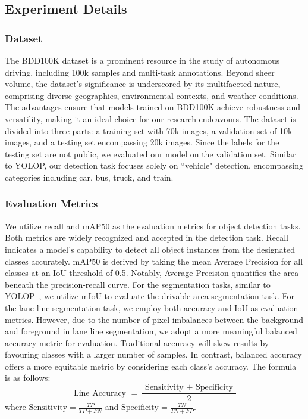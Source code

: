 \documentclass[lettersize,journal]{IEEEtran}
\begin{document}
\subsection{Experiment Details}
\label{subsec: Experiment Details}

\subsubsection{Dataset}
\label{subsubsec: Dataset}
The BDD100K dataset is a prominent resource in the study of autonomous driving, including 100k samples and multi-task annotations. Beyond sheer volume, the dataset's significance is underscored by its multifaceted nature, comprising diverse geographies, environmental contexts, and weather conditions. The advantages ensure that models trained on BDD100K achieve robustness and versatility, making it an ideal choice for our research endeavours. The dataset is divided into three parts: a training set with 70k images, a validation set of 10k images, and a testing set encompassing 20k images. Since the labels for the testing set are not public, we evaluated our model on the validation set. Similar to YOLOP, our detection task focuses solely on ``vehicle" detection, encompassing categories including car, bus, truck, and train. 

\subsubsection{Evaluation Metrics}
\label{subsubsec: Evaluation Metrics}
We utilize recall and mAP50 as the evaluation metrics for object detection tasks. Both metrics are widely recognized and accepted in the detection task. Recall indicates a model's capability to detect all object instances from the designated classes accurately. mAP50 is derived by taking the mean Average Precision for all classes at an IoU threshold of 0.5. Notably, Average Precision quantifies the area beneath the precision-recall curve. For the segmentation tasks, similar to YOLOP~\cite{wu2022yolop}, we utilize mIoU to evaluate the drivable area segmentation task. For the lane line segmentation task, we employ both accuracy and IoU as evaluation metrics. However, due to the number of pixel imbalances between the background and foreground in lane line segmentation, we adopt a more meaningful balanced accuracy metric for evaluation. Traditional accuracy will skew results by favouring classes with a larger number of samples. In contrast, balanced accuracy offers a more equitable metric by considering each class's accuracy. The formula is as follows:
\begin{equation}
\text { Line Accuracy }=\frac{\text { Sensitivity }+ \text { Specificity }}{2}
\end{equation}
where $\text{Sensitivity} = \frac{TP}{TP + FN}$ and $\text{Specificity} = \frac{TN}{TN + FP}$. 
\end{document}
